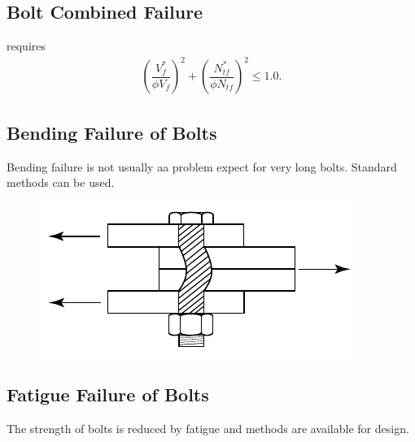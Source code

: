 \subsection{Bolt Combined Failure}\label{sec:bolt_combined}
 requires
\begin{gather}
\left(\dfrac{V^*_{f}}{\phi{}V_{f}}\right)^2+\left(\dfrac{N^*_{tf}}{\phi{}N_{tf}}\right)^2\leqslant1.0.
\end{gather}
\begin{figure}[H]
\centering
\end{figure}
\subsection{Bending Failure of Bolts}
Bending failure is not usually aa problem expect for very long bolts. Standard methods can be used.
\begin{figure}[H]
\centering
\includegraphics{PIC/CH06/BBF}
\end{figure}
\subsection{Fatigue Failure of Bolts}
The strength of bolts is reduced by fatigue and methods are available for design.
